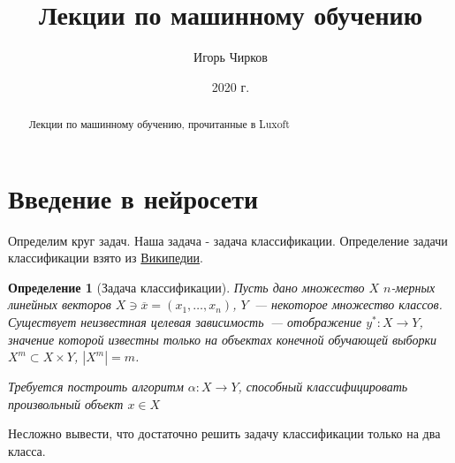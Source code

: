 \documentclass[12pt]{article}
\title{Лекции по машинному обучению}
\author{Игорь Чирков}
\date{2020 г.}
\newtheorem{definition}{Определение}
\begin{document}
    \begin{titlepage}
        \maketitle
    \end{titlepage}

    \begin{abstract}
        Лекции по машинному обучению, прочитанные в Luxoft
    \end{abstract}

    \section{Введение в нейросети}\label{sec:введение-в-нейросети}


    Определим круг задач.
    Наша задача - задача классификации.
    Определение задачи классификации взято из
    \href{https://en.wikipedia.org/wiki/Statistical_classification}{Википедии}.

    \begin{definition}[Задача классификации]
        Пусть дано множество $X$ $n$-мерных линейных векторов $X \ni \overline{x} = (x_1, \ldots, x_n)$,
        $Y$~--- некоторое множество классов.
        Существует неизвестная целевая зависимость~--- отображение $y^*: X\to Y$, значение которой известны только
        на объектах конечной обучающей выборки $X^m \subset X \times Y$, $| X^m | = m$.

        Требуется построить алгоритм $\alpha: X \to Y$, способный классифицировать произвольный объект
        $x \in X$
    \end{definition}

    Несложно вывести, что достаточно решить задачу классификации только на два класса.



\end{document}

